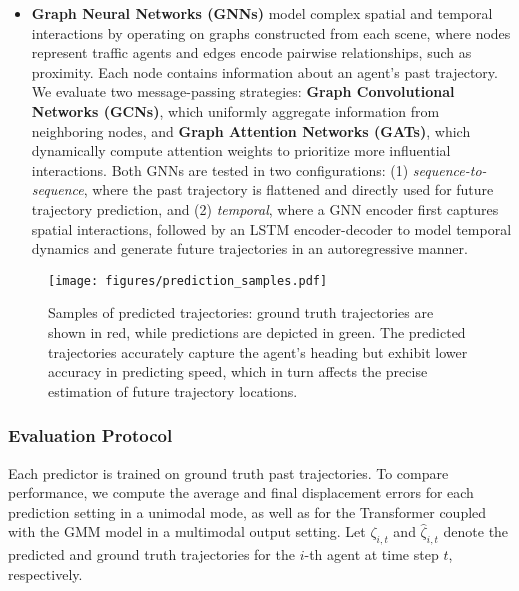 \begin{itemize}
    \item \textbf{Graph Neural Networks (GNNs)} model complex spatial and temporal interactions by operating on graphs constructed from each scene, where nodes represent traffic agents and edges encode pairwise relationships, such as proximity. Each node contains information about an agent's past trajectory. We evaluate two message-passing strategies: \textbf{Graph Convolutional Networks (GCNs)}, which uniformly aggregate information from neighboring nodes, and \textbf{Graph Attention Networks (GATs)}, which dynamically compute attention weights to prioritize more influential interactions. Both GNNs are tested in two configurations: (1) \textit{sequence-to-sequence}, where the past trajectory is flattened and directly used for future trajectory prediction, and (2) \textit{temporal}, where a GNN encoder first captures spatial interactions, followed by an LSTM encoder-decoder to model temporal dynamics and generate future trajectories in an autoregressive manner.
  
\end{itemize}


\begin{figure*}[h!]
\centering
\texttt{[image: figures/prediction\_samples.pdf]}
\caption{Samples of predicted trajectories: ground truth trajectories are shown in red, while predictions are depicted in green. The predicted trajectories accurately capture the agent's heading but exhibit lower accuracy in predicting speed, which in turn affects the precise estimation of future trajectory locations.}
\label{fig:prediction_samples}
\end{figure*}


\subsubsection{Evaluation Protocol}
Each predictor is trained on ground truth past trajectories. To compare performance, we compute the average and final displacement errors for each prediction setting in a unimodal mode, as well as for the Transformer coupled with the GMM model in a multimodal output setting. Let $\zeta_{i,t}$ and $\hat{\zeta}_{i,t}$ denote the predicted and ground truth trajectories for the $i$-th agent at time step $t$, respectively.

